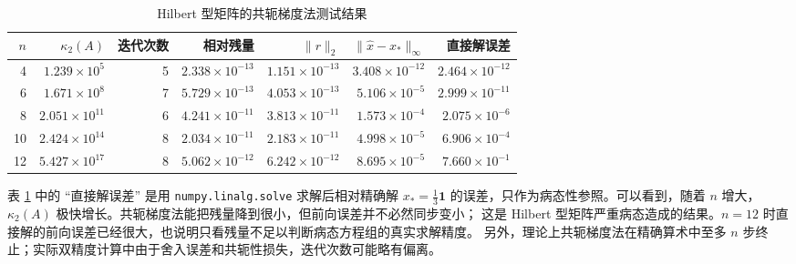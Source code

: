 \documentclass[a4paper,11pt]{article}
\begin{document}
\begin{table}[H]
\centering
\small
\caption{Hilbert 型矩阵的共轭梯度法测试结果}
\label{tab:hilbert}
\begin{tabular}{rrrrrrr}
\toprule
$n$ & $\kappa_2(A)$ & 迭代次数 & 相对残量 & $\|r\|_2$ & $\|\hat x-x_\ast\|_\infty$ & 直接解误差 \\
\midrule
4  & $1.239\times10^5$  & 5 & $2.338\times10^{-13}$ & $1.151\times10^{-13}$ & $3.408\times10^{-12}$ & $2.464\times10^{-12}$ \\
6  & $1.671\times10^8$  & 7 & $5.729\times10^{-13}$ & $4.053\times10^{-13}$ & $5.106\times10^{-5}$  & $2.999\times10^{-11}$ \\
8  & $2.051\times10^{11}$ & 6 & $4.241\times10^{-11}$ & $3.813\times10^{-11}$ & $1.573\times10^{-4}$  & $2.075\times10^{-6}$ \\
10 & $2.424\times10^{14}$ & 8 & $2.034\times10^{-11}$ & $2.183\times10^{-11}$ & $4.998\times10^{-5}$  & $6.906\times10^{-4}$ \\
12 & $5.427\times10^{17}$ & 8 & $5.062\times10^{-12}$ & $6.242\times10^{-12}$ & $8.695\times10^{-5}$  & $7.660\times10^{-1}$ \\
\bottomrule
\end{tabular}
\end{table}

表 \ref{tab:hilbert} 中的 ``直接解误差'' 是用 \verb|numpy.linalg.solve| 求解后相对精确解
$x_\ast=\frac13\mathbf 1$ 的误差，只作为病态性参照。可以看到，随着 $n$ 增大，
$\kappa_2(A)$ 极快增长。共轭梯度法能把残量降到很小，但前向误差并不必然同步变小；
这是 Hilbert 型矩阵严重病态造成的结果。$n=12$ 时直接解的前向误差已经很大，也说明只看残量不足以判断病态方程组的真实求解精度。
另外，理论上共轭梯度法在精确算术中至多 $n$ 步终止；实际双精度计算中由于舍入误差和共轭性损失，迭代次数可能略有偏离。
\end{document}
